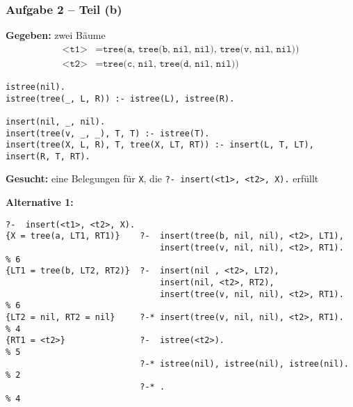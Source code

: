 \documentclass{beamer}
\begin{document}
\begin{frame}[fragile] \frametitle{Aufgabe 2 -- Teil (b)}
	\scriptsize
	\textbf{Gegeben:} zwei Bäume
	\begin{align*}
		\texttt{<t1>} &= \texttt{tree(a, tree(b, nil, nil), tree(v, nil, nil))} \\
		\texttt{<t2>} &= \texttt{tree(c, nil, tree(d, nil, nil))}
	\end{align*}
	\begin{lstlisting}[basicstyle=\ttfamily\tiny]
istree(nil).
istree(tree(_, L, R)) :- istree(L), istree(R).

insert(nil, _, nil).
insert(tree(v, _, _), T, T) :- istree(T).
insert(tree(X, L, R), T, tree(X, LT, RT)) :- insert(L, T, LT), insert(R, T, RT).
	\end{lstlisting}
	\textbf{Gesucht:} eine Belegungen für \texttt{X}, die \texttt{?- insert(<t1>, <t2>, X).} erfüllt
	


	\textbf{Alternative 1:}
	\begin{lstlisting}[style=refutation, basicstyle=\ttfamily\tiny]
                           ?-  insert(<t1>, <t2>, X).
{X = tree(a, LT1, RT1)}    ?-  insert(tree(b, nil, nil), <t2>, LT1), 
                               insert(tree(v, nil, nil), <t2>, RT1).   % 6
{LT1 = tree(b, LT2, RT2)}  ?-  insert(nil , <t2>, LT2), 
                               insert(nil, <t2>, RT2), 
                               insert(tree(v, nil, nil), <t2>, RT1).   % 6
{LT2 = nil, RT2 = nil}     ?-* insert(tree(v, nil, nil), <t2>, RT1).   % 4
{RT1 = <t2>}               ?-  istree(<t2>).                           % 5
                           ?-* istree(nil), istree(nil), istree(nil).  % 2
                           ?-* .                                       % 4
	\end{lstlisting}
\end{frame}
\end{document}
